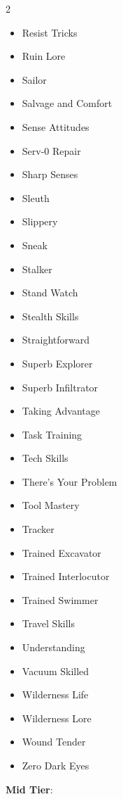 \begin{multicols}{2}
\begin{itemize}
\item Resist Tricks
\item Ruin Lore
\item Sailor
\item Salvage and Comfort
\item Sense Attitudes
\item Serv-0 Repair
\item Sharp Senses
\item Sleuth
\item Slippery
\item Sneak
\item Stalker
\item Stand Watch
\item Stealth Skills
\item Straightforward
\item Superb Explorer
\item Superb Infiltrator
\item Taking Advantage
\item Task Training
\item Tech Skills
\item There’s Your Problem
\item Tool Mastery
\item Tracker
\item Trained Excavator
\item Trained Interlocutor
\item Trained Swimmer
\item Travel Skills
\item Understanding
\item Vacuum Skilled
\item Wilderness Life
\item Wilderness Lore
\item Wound Tender
\item Zero Dark Eyes
\end{itemize}

\textbf{Mid Tier}:


\end{multicols}
